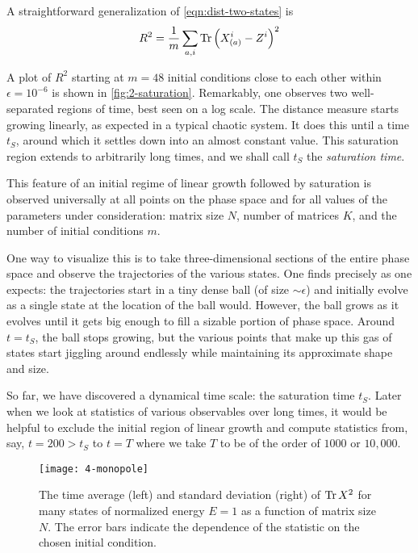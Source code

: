 A straightforward generalization of \cref{eqn:dist-two-states} is
\begin{equation}
    R^2 = \frac{1}{m} \sum_{a, i} \Tr \left( X^i_{(a)} - Z^i \right)^2
\end{equation}

A plot of $R^2$ starting at $m = 48$ initial conditions close to each other within $\epsilon = 10^{-6}$ is shown in \cref{fig:2-saturation}. Remarkably, one observes two well-separated regions of time, best seen on a log scale. The distance measure starts growing linearly, as expected in a typical chaotic system. It does this until a time $t_S$, around which it settles down into an almost constant value. This saturation region extends to arbitrarily long times, and we shall call $t_S$ the \textit{saturation time}.


This feature of an initial regime of linear growth followed by saturation is observed universally at all points on the phase space and for all values of the parameters under consideration: matrix size $N$, number of matrices $K$, and the number of initial conditions $m$.

One way to visualize this is to take three-dimensional sections of the entire phase space and observe the trajectories of the various states. One finds precisely as one expects: the trajectories start in a tiny dense ball (of size $\sim\epsilon$) and initially evolve as a single state at the location of the ball would. However, the ball grows as it evolves until it gets big enough to fill a sizable portion of phase space. Around $t = t_S$, the ball stops growing, but the various points that make up this gas of states start jiggling around endlessly while maintaining its approximate shape and size.

So far, we have discovered a dynamical time scale: the saturation time $t_S$. Later when we look at statistics of various observables over long times, it would be helpful to exclude the initial region of linear growth and compute statistics from, say, $t = 200 > t_S$ to $t = T$ where we take $T$ to be of the order of $1000$ or $10,000$.

\begin{figure}[H]
    \centering
    \texttt{[image: 4-monopole]}
    \caption{The time average (left) and standard deviation (right) of $\Tr X^2$ for many states of normalized energy $E = 1$ as a function of matrix size $N$. The error bars indicate the dependence of the statistic on the chosen initial condition.}
    \label{fig:4-monopole}
\end{figure}

